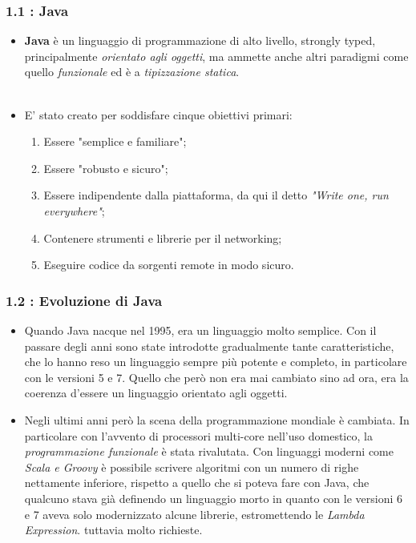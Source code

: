 \documentclass{beamer}
\begin{document}
\begin{frame}
	\frametitle{\textbf{1.1 : Java}}
	\begin{itemize}
		\item
			\textbf{Java} è un linguaggio di programmazione di alto livello, strongly typed, principalmente \textit{orientato agli oggetti}, ma ammette anche altri paradigmi come quello \textit{funzionale} ed è a \textit{tipizzazione statica}.\\\
		\item
			E' stato creato per soddisfare cinque obiettivi primari:
			\begin{enumerate}
				\item
					Essere "semplice e familiare";
				\item
					Essere "robusto e sicuro";
				\item
					Essere indipendente dalla piattaforma, da qui il detto \textit{"Write one, run everywhere"};
				\item
					Contenere strumenti e librerie per il networking;
				\item
					Eseguire codice da sorgenti remote in modo sicuro.
			\end{enumerate}
	\end{itemize}
\end{frame}


\begin{frame}
	\frametitle{\textbf{1.2 : Evoluzione di Java}}
		\begin{itemize}
			\item
				Quando Java nacque nel 1995, era un linguaggio molto semplice. Con il passare degli anni sono state introdotte gradualmente tante caratteristiche, che lo hanno reso un linguaggio sempre più potente e completo, in particolare con le versioni 5 e 7. Quello che però non era mai cambiato sino ad ora, era la coerenza d'essere un linguaggio orientato agli oggetti.
			\item 
				Negli ultimi anni però la scena della programmazione mondiale è cambiata. In particolare con l'avvento di processori multi-core nell'uso domestico, la \textit{programmazione funzionale} è stata rivalutata. Con linguaggi moderni come \textit{Scala e Groovy} è possibile scrivere algoritmi con un numero di righe nettamente inferiore, rispetto a quello che si poteva fare con Java, che qualcuno stava già definendo un linguaggio morto in quanto con le versioni 6 e 7 aveva solo modernizzato alcune librerie, estromettendo le \textit{Lambda Expression}. tuttavia molto richieste.
		\end{itemize}
\end{frame}
\end{document}
